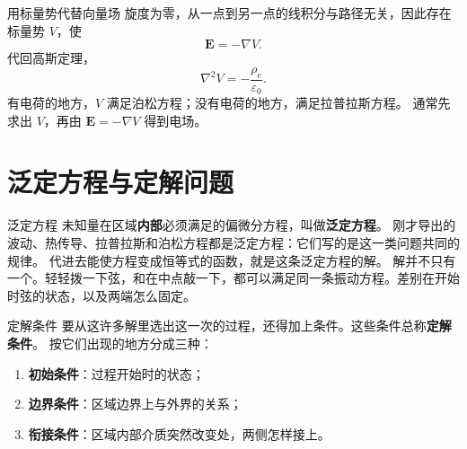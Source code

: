 \documentclass[fontset=windows, chinese, 10pt, xcolor=dvipsnames]{beamer}
\begin{document}
\begin{frame}{用标量势代替向量场}
  旋度为零，从一点到另一点的线积分与路径无关，因此存在标量势 $V$，使
  \begin{equation*}
    \mathbf{E}=-\nabla V.
  \end{equation*}
  代回高斯定理，
  \begin{equation*}
    \boxed{\nabla^2 V=-\dfrac{\rho_e}{\varepsilon_0}.}
  \end{equation*}
  有电荷的地方，$V$ 满足泊松方程；没有电荷的地方，满足拉普拉斯方程。
  \vspace{0.3em}
  通常先求出 $V$，再由 $\mathbf{E}=-\nabla V$ 得到电场。
\end{frame}

\section{泛定方程与定解问题}

\begin{frame}{泛定方程}
  未知量在区域\textbf{内部}必须满足的偏微分方程，叫做\textbf{泛定方程}。
  刚才导出的波动、热传导、拉普拉斯和泊松方程都是泛定方程：它们写的是这一类问题共同的规律。
  \vspace{0.4em}
  代进去能使方程变成恒等式的函数，就是这条泛定方程的解。
  解并不只有一个。轻轻拨一下弦，和在中点敲一下，都可以满足同一条振动方程。差别在开始时弦的状态，以及两端怎么固定。
\end{frame}

\begin{frame}{定解条件}
  要从这许多解里选出这一次的过程，还得加上条件。这些条件总称\textbf{定解条件}。
  \vspace{0.4em}
  按它们出现的地方分成三种：
  \begin{enumerate}
    \item \textbf{初始条件}：过程开始时的状态；
    \item \textbf{边界条件}：区域边界上与外界的关系；
    \item \textbf{衔接条件}：区域内部介质突然改变处，两侧怎样接上。
  \end{enumerate}
\end{frame}

\end{document}
